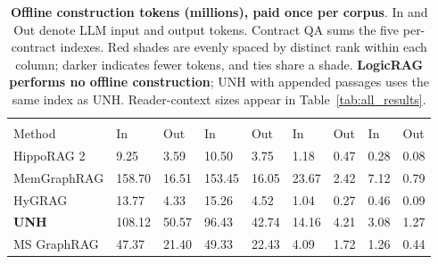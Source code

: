 \documentclass[sigconf, review, anonymous]{acmart}
\newcommand{\sys}{UNH}
\begin{document}
\begin{table}[t]
\centering
\caption{\normalfont \textbf{Offline construction tokens (millions), paid once per corpus}. In and Out denote LLM input and output tokens. Contract QA sums the five per-contract indexes. Red shades are evenly spaced by distinct rank within each column; darker indicates fewer tokens, and ties share a shade. \textbf{LogicRAG performs no offline construction}; \sys{} with appended passages uses the same index as \sys{}. Reader-context sizes appear in Table~\ref{tab:all_results}.}
\label{tab:cost_context} 
\small
\setlength{\tabcolsep}{4pt}
\begin{tabularx}{\textwidth}{@{}l*{8}{>{\centering\arraybackslash}X}@{}}
\toprule
& \multicolumn{2}{c}{HotpotQA} & \multicolumn{2}{c}{MuSiQue} & \multicolumn{2}{c}{G-Medical} & \multicolumn{2}{c}{Contract QA} \\
\cmidrule(lr){2-3}\cmidrule(lr){4-5}\cmidrule(lr){6-7}\cmidrule(l){8-9}
Method & In & Out & In & Out & In & Out & In & Out \\
\midrule
HippoRAG 2 & \cellcolor{UNHTokenRed!47}9.25 & \cellcolor{UNHTokenRed!47}3.59 & \cellcolor{UNHTokenRed!47}10.50 & \cellcolor{UNHTokenRed!47}3.75 & \cellcolor{UNHTokenRed!39}1.18 & \cellcolor{UNHTokenRed!39}0.47 & \cellcolor{UNHTokenRed!47}0.28 & \cellcolor{UNHTokenRed!47}0.08 \\
MemGraphRAG & \cellcolor{UNHTokenRed!16}158.70 & \cellcolor{UNHTokenRed!32}16.51 & \cellcolor{UNHTokenRed!16}153.45 & \cellcolor{UNHTokenRed!32}16.05 & \cellcolor{UNHTokenRed!8}23.67 & \cellcolor{UNHTokenRed!16}2.42 & \cellcolor{UNHTokenRed!8}7.12 & \cellcolor{UNHTokenRed!16}0.79 \\
HyGRAG & \cellcolor{UNHTokenRed!39}13.77 & \cellcolor{UNHTokenRed!39}4.33 & \cellcolor{UNHTokenRed!39}15.26 & \cellcolor{UNHTokenRed!39}4.52 & \cellcolor{UNHTokenRed!47}1.04 & \cellcolor{UNHTokenRed!47}0.27 & \cellcolor{UNHTokenRed!39}0.46 & \cellcolor{UNHTokenRed!39}0.09 \\
\textbf{\sys{}} & \cellcolor{UNHTokenRed!24}108.12 & \cellcolor{UNHTokenRed!8}50.57 & \cellcolor{UNHTokenRed!24}96.43 & \cellcolor{UNHTokenRed!8}42.74 & \cellcolor{UNHTokenRed!16}14.16 & \cellcolor{UNHTokenRed!8}4.21 & \cellcolor{UNHTokenRed!16}3.08 & \cellcolor{UNHTokenRed!8}1.27 \\
\midrule
MS GraphRAG & \cellcolor{UNHTokenRed!32}47.37 & \cellcolor{UNHTokenRed!16}21.40 & \cellcolor{UNHTokenRed!32}49.33 & \cellcolor{UNHTokenRed!16}22.43 & \cellcolor{UNHTokenRed!32}4.09 & \cellcolor{UNHTokenRed!32}1.72 & \cellcolor{UNHTokenRed!32}1.26 & \cellcolor{UNHTokenRed!32}0.44 \\

\end{tabularx}
\end{table}
\end{document}
